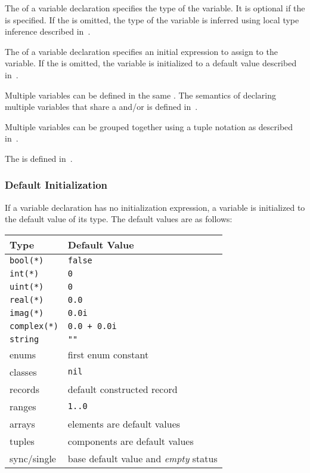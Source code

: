 The  of a variable declaration specifies the type of
the variable.  It is optional if the  is
specified.  If the  is omitted, the type of the
variable is inferred using local type inference described
in~.

The  of a variable declaration specifies an
initial expression to assign to the variable.  If
the  is omitted, the variable is initialized
to a default value described in~.

Multiple variables can be defined in the
same .  The semantics of declaring
multiple variables that share a 
and/or  is defined in~.

Multiple variables can be grouped together using a tuple notation as
described in~.

The  is defined
in~.

\subsubsection{Default Initialization}
\label{Default_Initialization}

If a variable declaration has no initialization expression, a variable
is initialized to the default value of its type.  The default values
are as follows:
\begin{center}
\begin{tabular}{|l|l|}
\hline
{\bf Type} & {\bf Default Value} \\
\hline
{\tt bool(*)} & {\tt false} \\
{\tt int(*)} & {\tt 0} \\
{\tt uint(*)} & {\tt 0} \\
{\tt real(*)} & {\tt 0.0} \\
{\tt imag(*)} & {\tt 0.0i} \\
{\tt complex(*)} & {\tt 0.0 + 0.0i} \\
{\tt string} & {\tt ""} \\
enums & first enum constant \\
classes & {\tt nil} \\
records & default constructed record \\
ranges & {\tt 1..0} \\
arrays & elements are default values \\
tuples & components are default values \\
sync/single & base default value and \emph{empty} status \\
\hline
\end{tabular}
\end{center}


